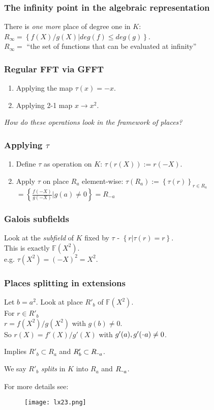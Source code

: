 \documentclass[shadesubsections,compress,14pt,mathserif]{beamer}
\newcommand{\minus}{\scalebox{0.5}[1.0]{\( - \)}}
\newcommand{\F}{\ensuremath{{\mathbb F}}}
\newcommand{\set}[1]{\ensuremath{\left\{#1\right\}}}
\newcommand{\sett}[2]{\ensuremath{\left\{#1\right\}_{#2}}}
\newcommand{\defeq}{\ensuremath{:=}}
\newcommand{\nl}{\\ \pause \vspace{0.2in}}
\newcommand{\nlnp}{\\ \vspace{0.2in}}
\begin{document}
\begin{frame}
 \frametitle{The infinity point in the algebraic representation}
 There is \emph{one more} place of degree one in $K$:
 $R_{\infty}=\set{f(X)/g(X)|deg(f)\leq deg(g)}$. \nl
 $R_{\infty}=$ ``the set of functions that can be evaluated at infinity''
 
\end{frame}
\begin{frame}
 \frametitle{Regular FFT via GFFT}
\begin{enumerate}
 \item Applying the map $\tau(x)=-x$.
 \item Applying 2-1 map $x\to x^2$.\nl
\end{enumerate}
\emph{How do these operations look in the framework of places?} 
\end{frame}
\begin{frame}
 \frametitle{Applying $\tau$}
 \begin{enumerate}
  \item Define $\tau$ as operation on $K$: $\tau(r(X)) \defeq  r(-X)$.\pause
  \item Apply $\tau$ on  place $R_a$ element-wise: $\tau(R_a)\defeq \sett{\tau(r)}{ r\in R_a}$
$  =\set{ \frac{f(-X)}{g(-X)}|g(a)\neq 0} = R_{-a}$
 \end{enumerate}

\end{frame}
\begin{frame}
 \frametitle{Galois subfields}
Look at the \emph{subfield} of $K$ fixed by $\tau$ - $\set{r|\tau(r)=r}$. \nl
This is exactly $\F(X^2)$.\\
e.g. $\tau(X^2)=(-X)^2 = X^2$.

 
\end{frame}
\begin{frame}
 \frametitle{Places splitting in extensions}
 Let $b=a^2$. Look at place $R'_b$ of $\F(X^2)$. \nl
 For $r\in R'_b$ \nlnp
 $r= f(X^2)/g(X^2)$ with $g(b)\neq 0$.\\
 So $r(X)=f'(X)/g'(X)$ with $g'(a),g'(\scalebox{0.5}[1.0]{\( - \)}a)\neq 0$.\nl

Implies $R'_b\subset R_a$ and $R'_b\subset R_{\minus a}$.\nl

We say $R'_b$ \emph{splits} in $K$ into $R_a$ and $R_{\minus a}$.
\end{frame}



\begin{frame}

 For more details see:
 \begin{figure}
  \texttt{[image: lx23.png]}
\end{figure}
 
\end{frame}
\end{document}
